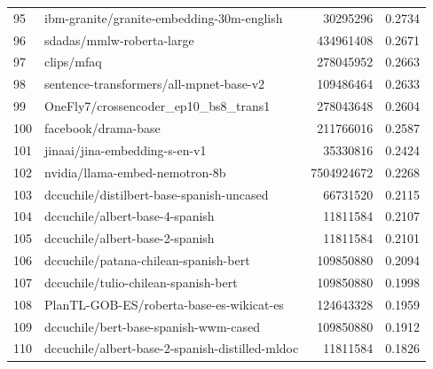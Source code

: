 {\begin{xltabular}{\textwidth}{l X rc}
    95               & ibm-granite/granite-embedding-30m-english                                  & 30295296      & 0.2734       \\
    96               & sdadas/mmlw-roberta-large                                                  & 434961408     & 0.2671       \\
    97               & clips/mfaq                                                                 & 278045952     & 0.2663       \\
    98               & sentence-transformers/all-mpnet-base-v2                                    & 109486464     & 0.2633       \\
    99               & OneFly7/crossencoder\_ep10\_bs8\_trans1                                    & 278043648     & 0.2604       \\
    100              & facebook/drama-base                                                        & 211766016     & 0.2587       \\
    101              & jinaai/jina-embedding-s-en-v1                                              & 35330816      & 0.2424       \\
    102              & nvidia/llama-embed-nemotron-8b                                             & 7504924672    & 0.2268       \\
    103              & dccuchile/distilbert-base-spanish-uncased                                  & 66731520      & 0.2115       \\
    104              & dccuchile/albert-base-4-spanish                                            & 11811584      & 0.2107       \\
    105              & dccuchile/albert-base-2-spanish                                            & 11811584      & 0.2101       \\
    106              & dccuchile/patana-chilean-spanish-bert                                      & 109850880     & 0.2094       \\
    107              & dccuchile/tulio-chilean-spanish-bert                                       & 109850880     & 0.1998       \\
    108              & PlanTL-GOB-ES/roberta-base-es-wikicat-es                                   & 124643328     & 0.1959       \\
    109              & dccuchile/bert-base-spanish-wwm-cased                                      & 109850880     & 0.1912       \\
    110              & dccuchile/albert-base-2-spanish-distilled-mldoc                            & 11811584      & 0.1826       \\

\end{xltabular}}
